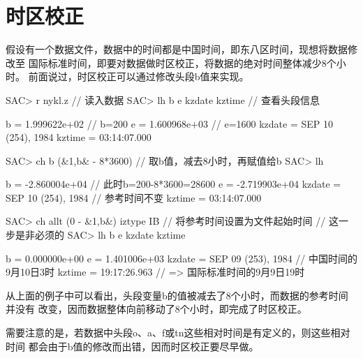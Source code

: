 \section{时区校正}
\label{sec:time-zone-correction}
假设有一个数据文件，数据中的时间都是中国时间，即东八区时间，现想将数据修改至
国际标准时间，即要对数据做时区校正，将数据的绝对时间整体减少8个小时。
前面说过，时区校正可以通过修改头段b值来实现。

\begin{SACCode}
SAC> r nykl.z                           // 读入数据
SAC> lh b e kzdate kztime               // 查看头段信息

          b = 1.999622e+02              // b=200
          e = 1.600968e+03              // e=1600
     kzdate = SEP 10 (254), 1984
     kztime = 03:14:07.000

SAC> ch b (&1,b& - 8*3600)              // 取b值，减去8小时，再赋值给b
SAC> lh

          b = -2.860004e+04             // 此时b=200-8*3600=28600
          e = -2.719903e+04
     kzdate = SEP 10 (254), 1984        // 参考时间不变
     kztime = 03:14:07.000

SAC> ch allt (0 - &1,b&) iztype IB      // 将参考时间设置为文件起始时间
                                        // 这一步是非必须的
SAC> lh b e kzdate kztime

          b = 0.000000e+00
          e = 1.401006e+03
     kzdate = SEP 09 (253), 1984        // 中国时间的9月10日3时
     kztime = 19:17:26.963              // => 国际标准时间的9月9日19时
\end{SACCode}

从上面的例子中可以看出，头段变量b的值被减去了8个小时，而数据的参考时间并没有
改变，因而数据整体向前移动了8个小时，即完成了时区校正。

需要注意的是，若数据中头段o、a、f或tn这些相对时间是有定义的，则这些相对时间
都会由于b值的修改而出错，因而时区校正要尽早做。
